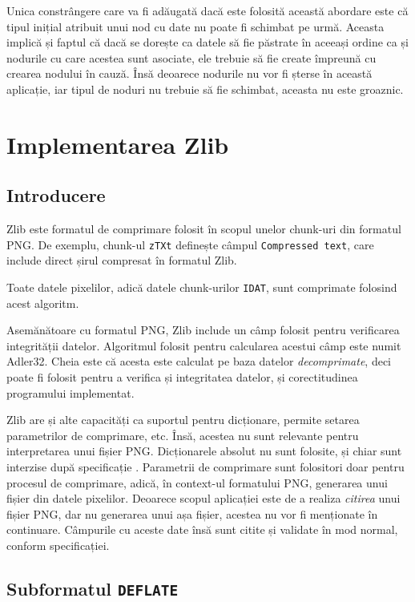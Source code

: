 \documentclass[a4paper,12pt]{report}
\begin{document}
Unica constrângere care va fi adăugată dacă este folosită această abordare este că
tipul inițial atribuit unui nod cu date nu poate fi schimbat pe urmă.
Aceasta implică și faptul că dacă se dorește ca datele să fie păstrate în aceeași ordine ca și
nodurile cu care acestea sunt asociate, ele trebuie să fie create împreună cu crearea nodului în cauză.
Însă deoarece nodurile nu vor fi șterse în această aplicație,
iar tipul de noduri nu trebuie să fie schimbat, aceasta nu este groaznic.


\section{Implementarea Zlib}

\subsection{Introducere}

Zlib este formatul de comprimare folosit în scopul unelor chunk-uri din formatul \ac{PNG}.
De exemplu, chunk-ul \texttt{zTXt} definește câmpul \texttt{Compressed text},
care include direct șirul compresat în formatul Zlib.

Toate datele pixelilor, adică datele chunk-urilor \texttt{IDAT}, sunt comprimate folosind acest algoritm.

Asemănătoare cu formatul \ac{PNG}, Zlib include un câmp folosit pentru verificarea integrității datelor.
Algoritmul folosit pentru calcularea acestui câmp este numit Adler32.
Cheia este că acesta este calculat pe baza datelor \textit{decomprimate},
deci poate fi folosit pentru a verifica și integritatea datelor, și corectitudinea programului implementat.

Zlib are și alte capacități ca suportul pentru dicționare, permite setarea parametrilor de comprimare, etc.
Însă, acestea nu sunt relevante pentru interpretarea unui fișier \ac{PNG}.
Dicționarele absolut nu sunt folosite, și chiar sunt interzise după specificație \cite{png_spec_chapter_deflate}.
Parametrii de comprimare sunt folositori doar pentru procesul de comprimare,
adică, în context-ul formatului \ac{PNG}, generarea unui fișier din datele pixelilor.
Deoarece scopul aplicației este de a realiza \textit{citirea} unui fișier \ac{PNG},
dar nu generarea unui așa fișier, acestea nu vor fi menționate în continuare.
Câmpurile cu aceste date însă sunt citite și validate în mod normal, conform specificației.

\subsection{Subformatul \texttt{DEFLATE}}
\end{document}
